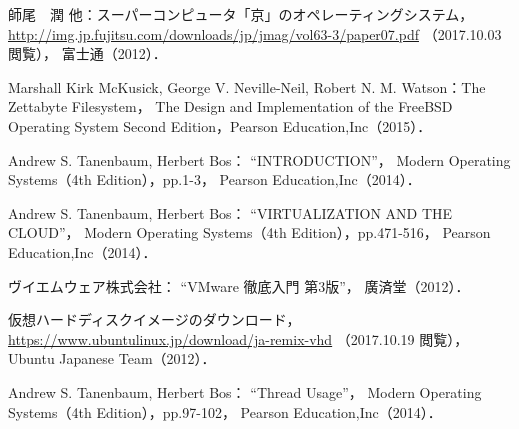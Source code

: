 \begin{thebibliography}{9}
師尾　潤 他：スーパーコンピュータ「京」のオペレーティングシステム，
\url{http://img.jp.fujitsu.com/downloads/jp/jmag/vol63-3/paper07.pdf}
（2017.10.03 閲覧），
富士通（2012）．

Marshall Kirk McKusick,
George V. Neville-Neil,
Robert N. M. Watson：The Zettabyte Filesystem，
The Design and Implementation of the FreeBSD Operating System
Second Edition，Pearson Education,Inc（2015）．


Andrew S. Tanenbaum, Herbert Bos：
``INTRODUCTION''，
Modern Operating Systems（4th Edition），pp.1-3，
Pearson Education,Inc（2014）．

Andrew S. Tanenbaum, Herbert Bos：
``VIRTUALIZATION AND THE CLOUD''，
Modern Operating Systems（4th Edition），pp.471-516，
Pearson Education,Inc（2014）．

ヴイエムウェア株式会社：
``VMware 徹底入門 第3版''，
廣済堂（2012）．

仮想ハードディスクイメージのダウンロード，
\url{https://www.ubuntulinux.jp/download/ja-remix-vhd}
（2017.10.19 閲覧），
Ubuntu Japanese Team（2012）．

Andrew S. Tanenbaum, Herbert Bos：
``Thread Usage''，
Modern Operating Systems（4th Edition），pp.97-102，
Pearson Education,Inc（2014）．

\end{thebibliography}
